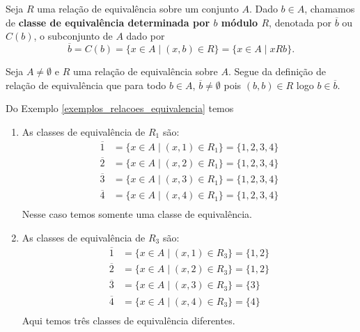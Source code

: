 \begin{definicao}
    Seja $R$ uma relação de equivalência sobre um conjunto $A$. Dado $b \in A$, chamamos de \textbf{classe de equivalência determinada por $b$ módulo $R$}, denotada por $\overline{b}$ ou $C(b)$, o subconjunto de $A$ dado por
    \[
        \overline{b} = C(b) = \{x \in A \mid (x,b) \in R\} = \{x \in A \mid xRb\}.
    \]
\end{definicao}

\begin{observacao}
    Seja $A \ne \emptyset$ e $R$ uma relação de equivalência sobre $A$. Segue da definição de relação de equivalência que para todo $b \in A$, $\overline{b} \ne \emptyset$ pois $(b,b) \in R$ logo $b \in \overline{b}$.
\end{observacao}

\begin{exemplos}\label{exemplos_classes_equivalencia}
    Do Exemplo \ref{exemplos_relacoes_equivalencia} temos
    \begin{enumerate}[label={\arabic*})]
        \item As classes de equivalência de $R_1$ são:
        \begin{align*}
            \overline{1} &= \{x \in A \mid (x,1) \in R_1\} = \{1,2,3,4\}\\
            \overline{2} &= \{x \in A \mid (x,2) \in R_1\} = \{1,2,3,4\}\\
            \overline{3} &= \{x \in A \mid (x,3) \in R_1\} = \{1,2,3,4\}\\
            \overline{4} &= \{x \in A \mid (x,4) \in R_1\} = \{1,2,3,4\}\\
        \end{align*}
        Nesse caso temos somente uma classe de equivalência.

        \item As classes de equivalência de $R_3$ são:
        \begin{align*}
            \overline{1} &= \{x \in A \mid (x,1) \in R_3\} = \{1,2\}\\
            \overline{2} &= \{x \in A \mid (x,2) \in R_3\} = \{1,2\}\\
            \overline{3} &= \{x \in A \mid (x,3) \in R_3\} = \{3\}\\
            \overline{4} &= \{x \in A \mid (x,4) \in R_3\} = \{4\}\\
        \end{align*}
        Aqui temos três classes de equivalência diferentes.


\end{enumerate}
\end{exemplos}
